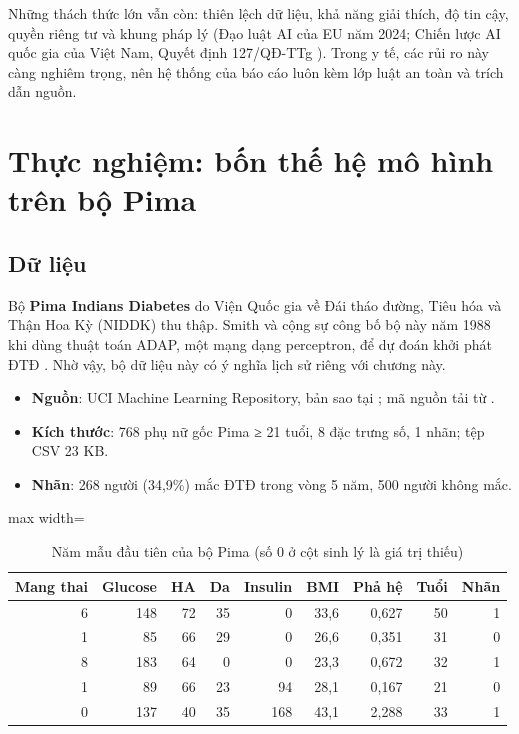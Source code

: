 Những thách thức lớn vẫn còn: thiên lệch dữ liệu, khả năng giải thích, độ tin cậy, quyền riêng tư và khung pháp lý (Đạo luật AI của EU năm 2024; Chiến lược AI quốc gia của Việt Nam, Quyết định 127/QĐ-TTg \cite{qd127}). Trong y tế, các rủi ro này càng nghiêm trọng, nên hệ thống của báo cáo luôn kèm lớp luật an toàn và trích dẫn nguồn.

\section{Thực nghiệm: bốn thế hệ mô hình trên bộ Pima}

\subsection{Dữ liệu}

Bộ \textbf{Pima Indians Diabetes} do Viện Quốc gia về Đái tháo đường, Tiêu hóa và Thận Hoa Kỳ (NIDDK) thu thập. Smith và cộng sự công bố bộ này năm 1988 khi dùng thuật toán ADAP, một mạng dạng perceptron, để dự đoán khởi phát ĐTĐ \cite{smith1988}. Nhờ vậy, bộ dữ liệu này có ý nghĩa lịch sử riêng với chương này.

\begin{itemize}
  \item \textbf{Nguồn}: UCI Machine Learning Repository, bản sao tại ; mã nguồn tải từ .
  \item \textbf{Kích thước}: 768 phụ nữ gốc Pima ≥ 21 tuổi, 8 đặc trưng số, 1 nhãn; tệp CSV 23 KB.
  \item \textbf{Nhãn}: 268 người (34,9\%) mắc ĐTĐ trong vòng 5 năm, 500 người không mắc.
\end{itemize}

\begin{table}[H]
\centering
\caption{Năm mẫu đầu tiên của bộ Pima (số 0 ở cột sinh lý là giá trị thiếu)}
\label{tab:pima-head}
\small
\begin{adjustbox}{max width=\linewidth}
\begin{tabular}{@{}rrrrrrrrr@{}}
\toprule
\textbf{Mang thai} & \textbf{Glucose} & \textbf{HA} & \textbf{Da} & \textbf{Insulin} & \textbf{BMI} & \textbf{Phả hệ} & \textbf{Tuổi} & \textbf{Nhãn} \\
\midrule
6 & 148 & 72 & 35 & 0 & 33,6 & 0,627 & 50 & 1 \\
1 & 85 & 66 & 29 & 0 & 26,6 & 0,351 & 31 & 0 \\
8 & 183 & 64 & 0 & 0 & 23,3 & 0,672 & 32 & 1 \\
1 & 89 & 66 & 23 & 94 & 28,1 & 0,167 & 21 & 0 \\
0 & 137 & 40 & 35 & 168 & 43,1 & 2,288 & 33 & 1 \\
\bottomrule
\end{tabular}
\end{adjustbox}
\end{table}


